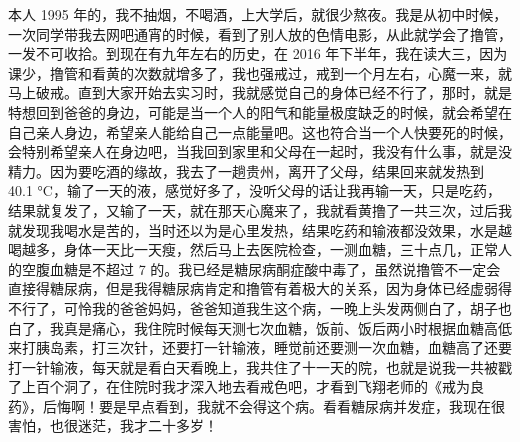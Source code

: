 \begin{case}
    本人 1995 年的，我不抽烟，不喝酒，上大学后，就很少熬夜。我是从初中时候，一次同学带我去网吧通宵的时候，看到了别人放的色情电影，从此就学会了撸管，一发不可收拾。到现在有九年左右的历史，在 2016 年下半年，我在读大三，因为课少，撸管和看黄的次数就增多了，我也强戒过，戒到一个月左右，心魔一来，就马上破戒。直到大家开始去实习时，我就感觉自己的身体已经不行了，那时，就是特想回到爸爸的身边，可能是当一个人的阳气和能量极度缺乏的时候，就会希望在自己亲人身边，希望亲人能给自己一点能量吧。这也符合当一个人快要死的时候，会特别希望亲人在身边吧，当我回到家里和父母在一起时，我没有什么事，就是没精力。因为要吃酒的缘故，我去了一趟贵州，离开了父母，结果回来就发热到 40.1 \unit{\degreeCelsius}，输了一天的液，感觉好多了，没听父母的话让我再输一天，只是吃药，结果就复发了，又输了一天，就在那天心魔来了，我就看黄撸了一共三次，过后我就发现我喝水是苦的，当时还以为是心里发热，结果吃药和输液都没效果，水是越喝越多，身体一天比一天瘦，然后马上去医院检查，一测血糖，三十点几，正常人的空腹血糖是不超过 7 的。我已经是糖尿病酮症酸中毒了，虽然说撸管不一定会直接得糖尿病，但是我得糖尿病肯定和撸管有着极大的关系，因为身体已经虚弱得不行了，可怜我的爸爸妈妈，爸爸知道我生这个病，一晚上头发两侧白了，胡子也白了，我真是痛心，我住院时候每天测七次血糖，饭前、饭后两小时根据血糖高低来打胰岛素，打三次针，还要打一针输液，睡觉前还要测一次血糖，血糖高了还要打一针输液，每天就是看白天看晚上，我共住了十一天的院，也就是说我一共被戳了上百个洞了，在住院时我才深入地去看戒色吧，才看到飞翔老师的《戒为良药》，后悔啊！要是早点看到，我就不会得这个病。看看糖尿病并发症，我现在很害怕，也很迷茫，我才二十多岁！


\end{case}
